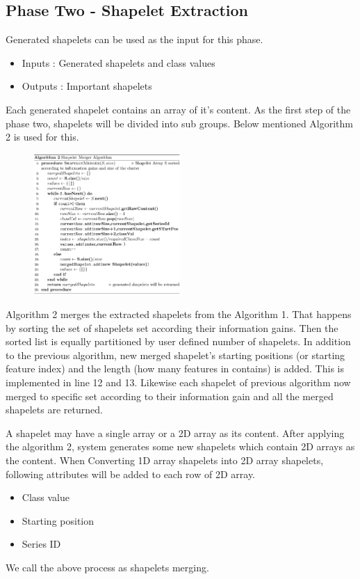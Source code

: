 \documentclass[conference]{IEEEtran}  %
\begin{document}
\subsection{Phase Two - Shapelet Extraction}
Generated shapelets can be used as the input for this phase.
\begin{itemize}
\item Inputs : Generated shapelets and class values
\item Outputs : Important shapelets
\end{itemize}
Each generated shapelet contains an array of it’s content. As the first step of the phase two, shapelets will be divided into sub groups. Below mentioned Algorithm 2 is used for this.

\begin{figure}[h!]
\includegraphics[width=0.5\textwidth]{algo2.png}
\end{figure}

Algorithm 2 merges the extracted shapelets from the Algorithm 1. That happens by sorting the set of shapelets set according their information gains. Then the sorted list is equally partitioned by user defined number of shapelets. In addition to the previous algorithm, new merged shapelet’s starting positions (or starting feature index) and the length (how many features in contains) is added. This is implemented in line 12 and 13. Likewise each shapelet of previous algorithm now merged to specific set according to their information gain and all the merged shapelets are returned.

A shapelet may have a single array or a 2D array as its content. After applying the algorithm 2, system generates some new shapelets which contain 2D arrays as the content. When Converting 1D array shapelets into 2D array shapelets, following attributes will be added to each row of 2D array.
\begin{itemize}
\item Class value
\item Starting position
\item Series ID
\end{itemize}
We call the above process as shapelets merging.
\end{document}
